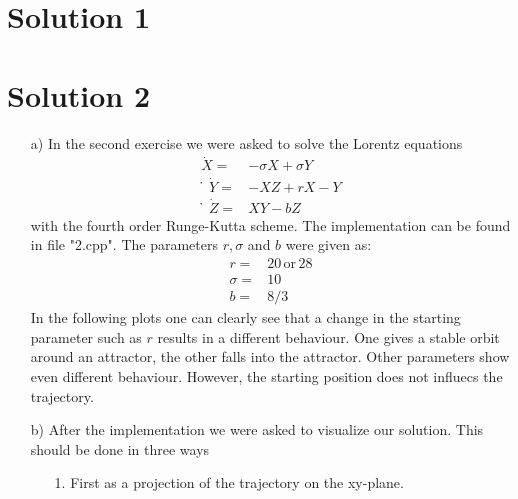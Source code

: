 
\section{Solution 1}
\label{sec:auswertung}


\section{Solution 2}
\label{sec:auswertung}
    \begin{itemize}
        \item[a)]
            In the second exercise we were asked to solve the Lorentz equations 
            \begin{align*}
                \dot{X} = & -\sigma X + \sigma Y \\
     ̇           \dot{Y} = & -XZ + rX - Y \\
     ̇           \dot{Z} = & XY - bZ
            \end{align*}
            with the fourth order Runge-Kutta scheme.
            The implementation can be found in file "2.cpp".
            The parameters $r, \sigma$ and $b$ were given as:
            \begin{align*}
                r = & 20 \,\text{or}\, 28\\
                \sigma = & 10 \\
                b = & 8/3
            \end{align*}
            In the following plots one can clearly see that a change in the starting parameter such as $r$ results in a different behaviour.
            One gives a stable orbit around an attractor, the other falls into the attractor.
            Other parameters show even different behaviour.
            However, the starting position does not influecs the trajectory.
        \item[b)]
            After the implementation we were asked to visualize our solution.
            This should be done in three ways
            \begin{itemize}
                \item[1.]
                    First as a projection of the trajectory on the xy-plane.
                    \FloatBarrier
                    \begin{figure}

\end{figure}
\end{itemize}
\end{itemize}
